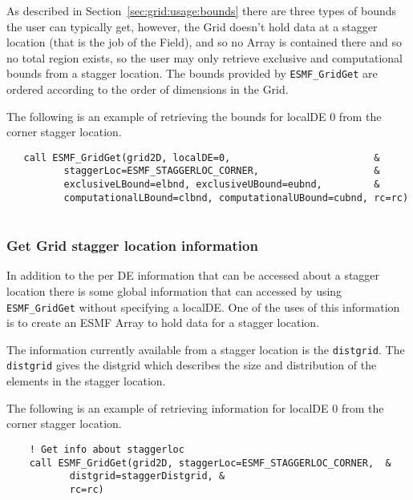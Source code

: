    As described in Section~\ref{sec:grid:usage:bounds} there are three types of bounds
   the user can typically get, however, the Grid doesn't hold data at
   a stagger location (that is the job of the Field), and so
   no Array is contained there and so no total region exists, so the
   user may only retrieve exclusive and computational bounds from
   a stagger location.  The bounds
   provided by {\tt ESMF\_GridGet} are ordered according to the
   order of dimensions in the Grid.
  
   The following is an example of retrieving the bounds for localDE 0
   from the corner stagger location. 

 \begin{verbatim}
   call ESMF_GridGet(grid2D, localDE=0,                         &
          staggerLoc=ESMF_STAGGERLOC_CORNER,                    &
          exclusiveLBound=elbnd, exclusiveUBound=eubnd,         &
          computationalLBound=clbnd, computationalUBound=cubnd, rc=rc)
 
\end{verbatim}
 

  \subsubsection{Get Grid stagger location information}
  
   In addition to the per DE information that can be accessed about
   a stagger location there is some global information that can
   accessed by using {\tt ESMF\_GridGet} without specifying a
   localDE. One of the uses of this information is to create
   an ESMF Array to hold data for a stagger location.
  
   \begin{sloppypar}
   The information currently available from a stagger
   location is the {\tt distgrid}. The {\tt distgrid} gives the
   distgrid which describes the size and distribution of the elements in the stagger location.
   \end{sloppypar}
  
   The following is an example of retrieving information for localDE 0
   from the corner stagger location. 

 \begin{verbatim}
    ! Get info about staggerloc
    call ESMF_GridGet(grid2D, staggerLoc=ESMF_STAGGERLOC_CORNER,  &
           distgrid=staggerDistgrid, &
           rc=rc)

 
\end{verbatim}
 
